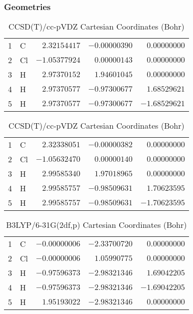 \documentclass[10pt,oneside]{article}
\begin{document}
\begin{table}[h!]
\subsubsection*{Geometries}
\begin{multicols}{2}
\centering
\caption{CCSD(T)/cc-pVTZ Cartesian Coordinates (Bohr)}
\begin{tabular}{llrrr}
\toprule
1  & C  & $ 2.32154417$ & $-0.00000390$ & $ 0.00000000$ \\
2  & Cl & $-1.05377924$ & $ 0.00000143$ & $ 0.00000000$ \\
3  & H  & $ 2.97370152$ & $ 1.94601045$ & $ 0.00000000$ \\
4  & H  & $ 2.97370577$ & $-0.97300677$ & $ 1.68529621$ \\
5  & H  & $ 2.97370577$ & $-0.97300677$ & $-1.68529621$ \\
\bottomrule
\end{tabular}
\caption{CCSD(T)/cc-pVDZ Cartesian Coordinates (Bohr)}
\begin{tabular}{llrrr}
\toprule
1  & C  & $ 2.32338051$ & $-0.00000382$ & $ 0.00000000$ \\
2  & Cl & $-1.05632470$ & $ 0.00000140$ & $ 0.00000000$ \\
3  & H  & $ 2.99585340$ & $ 1.97018965$ & $ 0.00000000$ \\
4  & H  & $ 2.99585757$ & $-0.98509631$ & $ 1.70623595$ \\
5  & H  & $ 2.99585757$ & $-0.98509631$ & $-1.70623595$ \\
\bottomrule
\end{tabular}
\end{multicols}
\end{table}

\begin{table}[h]
\centering
\caption{B3LYP/6-31G(2df,p) Cartesian Coordinates (Bohr)}
\begin{tabular}{llrrr}
\toprule
1  & C  & $-0.00000006$ & $-2.33700720$ & $ 0.00000000$ \\
2  & Cl & $-0.00000006$ & $ 1.05990775$ & $ 0.00000000$ \\
3  & H  & $-0.97596373$ & $-2.98321346$ & $ 1.69042205$ \\
4  & H  & $-0.97596373$ & $-2.98321346$ & $-1.69042205$ \\
5  & H  & $ 1.95193022$ & $-2.98321346$ & $ 0.00000000$ \\
\bottomrule
\end{tabular}
\end{table}
\end{document}
